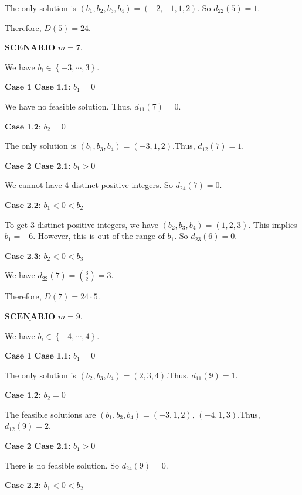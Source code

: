 \begin{enumerate}
 The only solution is $\left( b_1 , b_2 , b_3 , b_4 \right) = \left( - 2 , - 1 , 1 , 2 \right)$. So $d_{22} \left( 5 \right) = 1$.

 Therefore, $D \left( 5 \right) = 24$.

 
$\underline{\textbf{SCENARIO}}$ $m = 7$.

 We have $b_i \in \left\{ - 3 , \cdots , 3 \right\}$.

 $\textbf{Case 1}$
$\textbf{Case 1.1}$: $b_1 = 0$

 We have no feasible solution. Thus, $d_{11} \left( 7 \right) = 0$.

 $\textbf{Case 1.2}$: $b_2 = 0$

 The only solution is $\left( b_1 , b_3 , b_4 \right) = \left( - 3 , 1 , 2 \right)$.Thus, $d_{12} \left( 7 \right) = 1$.

 $\textbf{Case 2}$
$\textbf{Case 2.1}$: $b_1 > 0$

 We cannot have $4$ distinct positive integers. So $d_{24} \left( 7 \right) = 0$.

 $\textbf{Case 2.2}$: $b_1 < 0 < b_2$

 To get $3$ distinct positive integers, we have $\left( b_2 , b_3 , b_4 \right) = \left( 1 , 2 , 3 \right)$. This implies $b_1 = - 6$. However, this is out of the range of $b_1$. So $d_{23} \left( 6 \right) = 0$.

 $\textbf{Case 2.3}$: $b_2 < 0 < b_3$

 We have $d_{22} \left( 7 \right) = \binom{3}{2} = 3$.

 Therefore, $D \left( 7 \right) = 24 \cdot 5$.

 
$\underline{\textbf{SCENARIO}}$ $m = 9$.

 We have $b_i \in \left\{ - 4 , \cdots , 4 \right\}$.

 $\textbf{Case 1}$
$\textbf{Case 1.1}$: $b_1 = 0$

 The only solution is $\left( b_2 , b_3 , b_4 \right) = \left(  2, 3, 4 \right)$.Thus, $d_{11} \left( 9 \right) = 1$.

 $\textbf{Case 1.2}$: $b_2 = 0$

 The feasible solutions are $\left( b_1 , b_3 , b_4 \right) = \left( - 3 , 1 , 2 \right)$, $\left( - 4 , 1 , 3 \right)$.Thus, $d_{12} \left( 9 \right) = 2$.

 $\textbf{Case 2}$
$\textbf{Case 2.1}$: $b_1 > 0$

 There is no feasible solution. So $d_{24} \left( 9 \right) = 0$.

 $\textbf{Case 2.2}$: $b_1 < 0 < b_2$


\end{enumerate}
